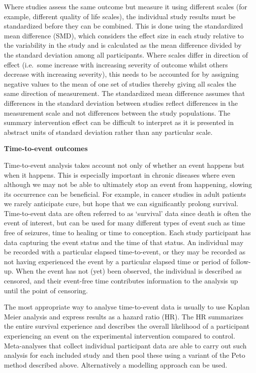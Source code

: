 \documentclass[
  10pt,
  a4paper,
  DIV=11,
  numbers=noendperiod]{scrreprt}
\begin{document}
Where studies assess the same outcome but measure it using different
scales (for example, different quality of life scales), the individual
study results must be standardized before they can be combined. This is
done using the standardized mean difference (SMD), which considers the
effect size in each study relative to the variability in the study and
is calculated as the mean difference divided by the standard deviation
among all participants. Where scales differ in direction of effect
(i.e.~some increase with increasing severity of outcome whilst others
decrease with increasing severity), this needs to be accounted for by
assigning negative values to the mean of one set of studies thereby
giving all scales the same direction of measurement. The standardized
mean difference assumes that differences in the standard deviation
between studies reflect differences in the measurement scale and not
differences between the study populations. The summary intervention
effect can be difficult to interpret as it is presented in abstract
units of standard deviation rather than any particular scale.

\textbf{Time-to-event outcomes}

Time-to-event analysis takes account not only of whether an event
happens but when it happens. This is especially important in chronic
diseases where even although we may not be able to ultimately stop an
event from happening, slowing its occurrence can be beneficial. For
example, in cancer studies in adult patients we rarely anticipate cure,
but hope that we can significantly prolong survival. Time-to-event data
are often referred to as `survival' data since death is often the event
of interest, but can be used for many different types of event such as
time free of seizures, time to healing or time to conception. Each study
participant has data capturing the event status and the time of that
status. An individual may be recorded with a particular elapsed
time-to-event, or they may be recorded as not having experienced the
event by a particular elapsed time or period of follow-up. When the
event has not (yet) been observed, the individual is described as
censored, and their event-free time contributes information to the
analysis up until the point of censoring.

The most appropriate way to analyse time-to-event data is usually to use
Kaplan Meier analysis and express results as a hazard ratio (HR). The HR
summarizes the entire survival experience and describes the overall
likelihood of a participant experiencing an event on the experimental
intervention compared to control. Meta-analyses that collect individual
participant data are able to carry out such analysis for each included
study and then pool these using a variant of the Peto method described
above. Alternatively a modelling approach can be used.
\end{document}
